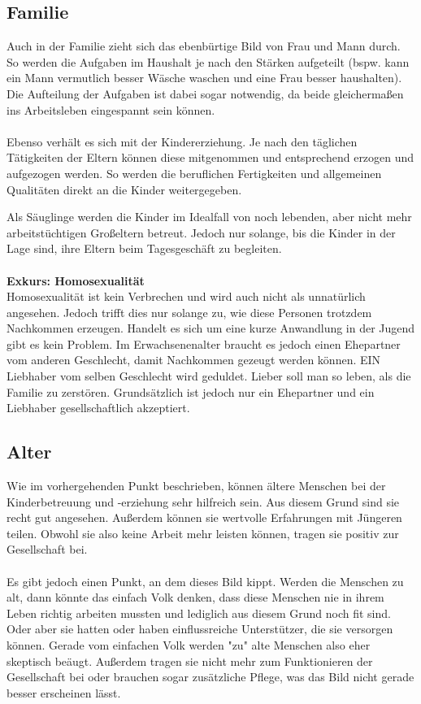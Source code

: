 \subsection{Familie}
Auch in der Familie zieht sich das ebenbürtige Bild von Frau und Mann durch. So werden die Aufgaben im Haushalt je nach den Stärken aufgeteilt (bspw. kann ein Mann vermutlich besser Wäsche waschen und eine Frau besser haushalten). Die Aufteilung der Aufgaben ist dabei sogar notwendig, da beide gleichermaßen ins Arbeitsleben eingespannt sein können.
\\
\\
Ebenso verhält es sich mit der Kindererziehung. Je nach den täglichen Tätigkeiten der Eltern können diese mitgenommen und entsprechend erzogen und aufgezogen werden. So werden die beruflichen Fertigkeiten und allgemeinen Qualitäten direkt an die Kinder weitergegeben.

Als Säuglinge werden die Kinder im Idealfall von noch lebenden, aber nicht mehr arbeitstüchtigen Großeltern betreut. Jedoch nur solange, bis die Kinder in der Lage sind, ihre Eltern beim Tagesgeschäft zu begleiten.
\\
\\
\textbf{Exkurs: Homosexualität}\\
Homosexualität ist kein Verbrechen und wird auch nicht als unnatürlich angesehen. Jedoch trifft dies nur solange zu, wie diese Personen trotzdem Nachkommen erzeugen. Handelt es sich um eine kurze Anwandlung in der Jugend gibt es kein Problem. Im Erwachsenenalter braucht es jedoch einen Ehepartner vom anderen Geschlecht, damit Nachkommen gezeugt werden können. EIN Liebhaber vom selben Geschlecht wird geduldet. Lieber soll man so leben, als die Familie zu zerstören. Grundsätzlich ist jedoch nur ein Ehepartner und ein Liebhaber gesellschaftlich akzeptiert.

\subsection{Alter}
Wie im vorhergehenden Punkt beschrieben, können ältere Menschen bei der Kinderbetreuung und -erziehung sehr hilfreich sein. Aus diesem Grund sind sie recht gut angesehen. Außerdem können sie wertvolle Erfahrungen mit Jüngeren teilen. Obwohl sie also keine Arbeit mehr leisten können, tragen sie positiv zur Gesellschaft bei.
\\
\\
Es gibt jedoch einen Punkt, an dem dieses Bild kippt. Werden die Menschen zu alt, dann könnte das einfach Volk denken, dass diese Menschen nie in ihrem Leben richtig arbeiten mussten und lediglich aus diesem Grund noch fit sind. Oder aber sie hatten oder haben einflussreiche Unterstützer, die sie versorgen können. Gerade vom einfachen Volk werden "zu" alte Menschen also eher skeptisch beäugt. Außerdem tragen sie nicht mehr zum Funktionieren der Gesellschaft bei oder brauchen sogar zusätzliche Pflege, was das Bild nicht gerade besser erscheinen lässt.

